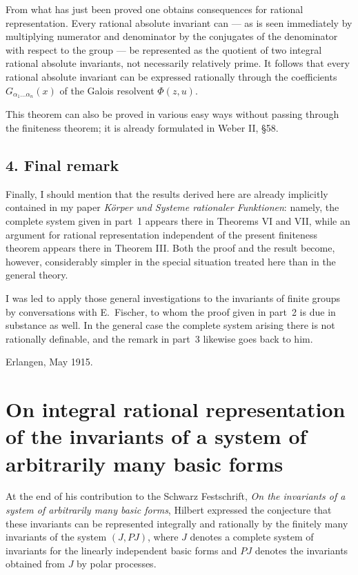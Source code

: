 \documentclass[11pt]{article}
\begin{document}
From what has just been proved one obtains consequences for rational representation. Every rational absolute invariant can --- as is seen immediately by multiplying numerator and denominator by the conjugates of the denominator with respect to the group --- be represented as the quotient of two integral rational absolute invariants, not necessarily relatively prime. It follows that every rational absolute invariant can be expressed rationally through the coefficients $G_{\alpha_1\dots\alpha_n}(x)$ of the Galois resolvent $\Phi(z,u)$.

This theorem can also be proved in various easy ways without passing through the finiteness theorem; it is already formulated in Weber II, \S 58.

\subsection*{4. Final remark}

Finally, I should mention that the results derived here are already implicitly contained in my paper \emph{Körper und Systeme rationaler Funktionen}: namely, the complete system given in part~1 appears there in Theorems VI and VII, while an argument for rational representation independent of the present finiteness theorem appears there in Theorem III. Both the proof and the result become, however, considerably simpler in the special situation treated here than in the general theory.

I was led to apply those general investigations to the invariants of finite groups by conversations with E.~Fischer, to whom the proof given in part~2 is due in substance as well. In the general case the complete system arising there is not rationally definable, and the remark in part~3 likewise goes back to him.

\begin{flushright}
Erlangen, May 1915.
\end{flushright}

\clearpage

\section*{On integral rational representation of the invariants of a system of arbitrarily many basic forms}

At the end of his contribution to the Schwarz Festschrift, \emph{On the invariants of a system of arbitrarily many basic forms}, Hilbert expressed the conjecture that these invariants can be represented integrally and rationally by the finitely many invariants of the system \((J,PJ)\), where \(J\) denotes a complete system of invariants for the linearly independent basic forms and \(PJ\) denotes the invariants obtained from \(J\) by polar processes.
\end{document}
